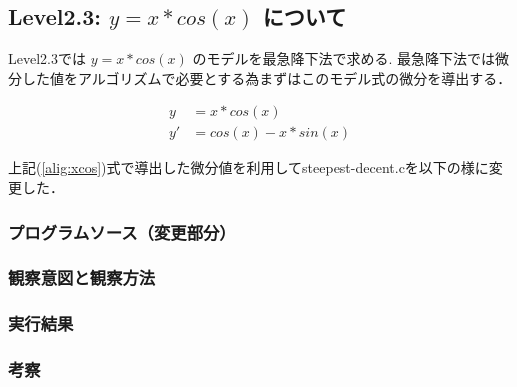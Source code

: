 \subsection{Level2.3: $y=x*cos(x)$ について}
Level2.3では $y=x*cos(x)$ のモデルを最急降下法で求める.
最急降下法では微分した値をアルゴリズムで必要とする為まずはこのモデル式の微分を導出する．

\begin{align}
    y &= x * cos(x) \\
    y' &= cos(x) - x * sin(x)
    \label{alig:xcos}
\end{align}

上記(\ref{alig:xcos})式で導出した微分値を利用してsteepest-decent.cを以下の様に変更した．

\subsubsection{プログラムソース（変更部分）}
\subsubsection{観察意図と観察方法}
\subsubsection{実行結果}
\subsubsection{考察}

